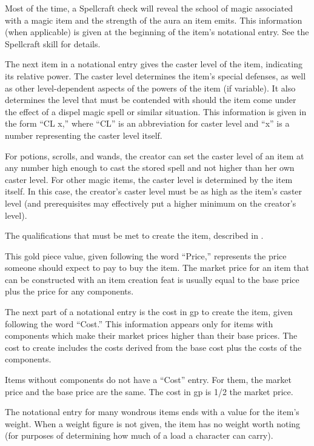 \begin{itemize*}
 Most of the time, a Spellcraft check will reveal the school of magic associated with a magic item and the strength of the aura an item emits. This information (when applicable) is given at the beginning of the item's notational entry. See the Spellcraft skill for details.

 The next item in a notational entry gives the caster level of the item, indicating its relative power. The caster level determines the item's special defenses, as well as other level-dependent aspects of the powers of the item (if variable). It also determines the level that must be contended with should the item come under the effect of a dispel magic spell or similar situation. This information is given in the form ``CL x,'' where ``CL'' is an abbreviation for caster level and ``x'' is a number representing the caster level itself.

For potions, scrolls, and wands, the creator can set the caster level of an item at any number high enough to cast the stored spell and not higher than her own caster level. For other magic items, the caster level is determined by the item itself. In this case, the creator's caster level must be as high as the item's caster level (and prerequisites may effectively put a higher minimum on the creator's level).

 The qualifications that must be met to create the item, described in .

 This gold piece value, given following the word ``Price,'' represents the price someone should expect to pay to buy the item. The market price for an item that can be constructed with an item creation feat is usually equal to the base price plus the price for any components.

 The next part of a notational entry is the cost in gp to create the item, given following the word ``Cost.'' This information appears only for items with components which make their market prices higher than their base prices. The cost to create includes the costs derived from the base cost plus the costs of the components.

Items without components do not have a ``Cost'' entry. For them, the market price and the base price are the same. The cost in gp is 1/2 the market price.

 The notational entry for many wondrous items ends with a value for the item's weight. When a weight figure is not given, the item has no weight worth noting (for purposes of determining how much of a load a character can carry).
\end{itemize*}

